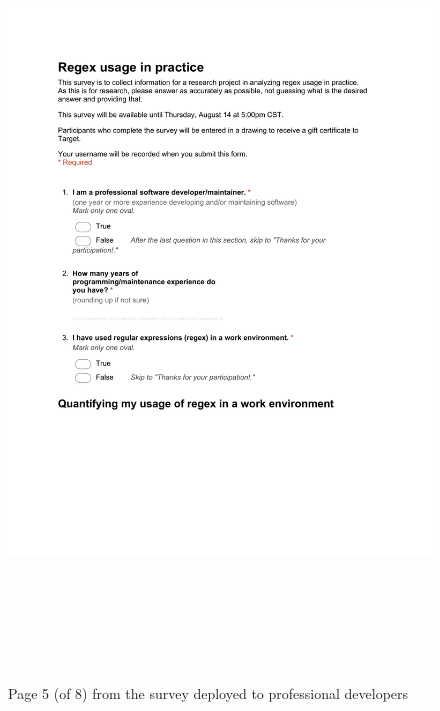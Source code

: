 \begin{figure}[!htbp]
   \centering
       \includegraphics[page=5, height=21cm,keepaspectratio]{nontex/appendix/regexUsageInPracticeSurvey}
 \caption{Page 5 (of 8) from the survey deployed to professional developers}
 \label{fig:surveyPDF5}
\end{figure}
